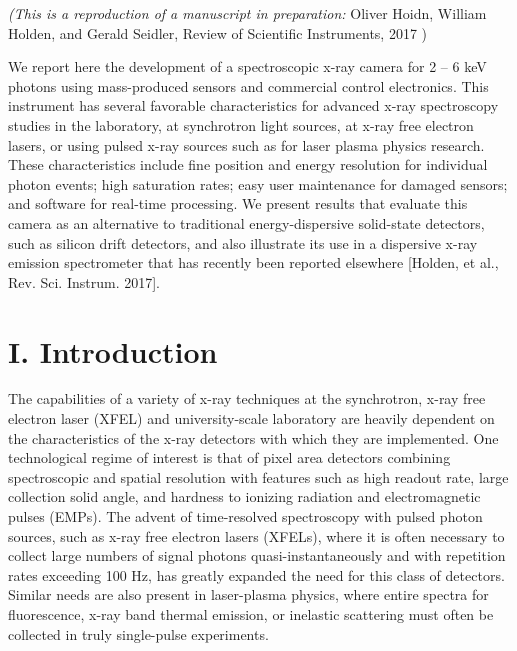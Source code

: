 \emph{(This is a reproduction of a manuscript in preparation: }
Oliver Hoidn, William Holden, and Gerald Seidler,
Review of Scientific Instruments, 2017
)


\begin{addmargin}[2.5em]{2.5em}
We report here the development of a spectroscopic x-ray camera for 2 --
6 keV photons using mass-produced sensors and commercial control
electronics. This instrument has several favorable characteristics for
advanced x-ray spectroscopy studies in the laboratory, at synchrotron
light sources, at x-ray free electron lasers, or using pulsed x-ray
sources such as for laser plasma physics research. These characteristics
include fine position and energy resolution for individual photon
events; high saturation rates; easy user maintenance for damaged
sensors; and software for real-time processing. We present results that
evaluate this camera as an alternative to traditional energy-dispersive
solid-state detectors, such as silicon drift detectors, and also
illustrate its use in a dispersive x-ray emission spectrometer that has
recently been reported elsewhere {[}Holden, et al., Rev. Sci. Instrum.
2017{]}.
\end{addmargin}

\section{I. Introduction}
The capabilities of a variety of x-ray techniques at the synchrotron,
x-ray free electron laser (XFEL) and university-scale laboratory are
heavily dependent on the characteristics of the x-ray detectors with
which they are implemented. One technological regime of interest is that
of pixel area detectors combining spectroscopic and spatial resolution
with features such as high readout rate, large collection solid angle,
and hardness to ionizing radiation and electromagnetic pulses (EMPs).
The advent of time-resolved spectroscopy with pulsed photon sources,
such as x-ray free electron lasers (XFELs), where it is often necessary
to collect large numbers of signal photons quasi-instantaneously and
with repetition rates exceeding 100 Hz, has greatly expanded the need
for this class of detectors. Similar needs are also present in
laser-plasma physics, where entire spectra for fluorescence, x-ray band
thermal emission, or inelastic scattering must often be collected in
truly single-pulse experiments.

